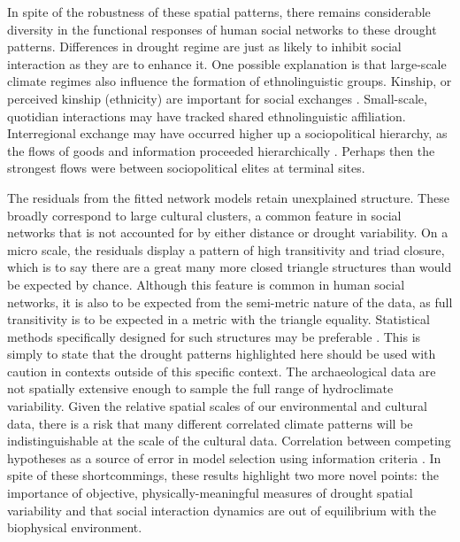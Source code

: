 \documentclass[10pt]{iopart}
\begin{document}

In spite of the robustness of these spatial patterns, there remains considerable diversity in the functional responses of human social networks to these drought patterns. Differences in drought regime are just as likely to inhibit social interaction as they are to enhance it. One possible explanation is that large-scale climate regimes also influence the formation of ethnolinguistic groups. Kinship, or perceived kinship (ethnicity) are important for social exchanges \parencite{Nolin2010}. Small-scale, quotidian interactions may have tracked shared ethnolinguistic affiliation. Interregional exchange may have occurred higher up a sociopolitical hierarchy, as the flows of goods and information proceeded hierarchically \parencite{Crumley1979}. Perhaps then the strongest flows were between sociopolitical elites at terminal sites.
 
The residuals from the fitted network models retain unexplained structure. These broadly correspond to large cultural clusters, a common feature in social networks that is not accounted for by either distance or drought variability. On a micro scale, the residuals display a pattern of high transitivity and triad closure, which is to say there are a great many more closed triangle structures than would be expected by chance. Although this feature is common in human social networks, it is also to be expected from the semi-metric nature of the data, as full transitivity is to be expected in a metric with the triangle equality. Statistical methods specifically designed for such structures may be preferable \parencite{Stillman2017}. This is simply to state that the drought patterns highlighted here should be used with caution in contexts outside of this specific context. The archaeological data are not spatially extensive enough to sample the full range of hydroclimate variability. Given the relative spatial scales of our environmental and cultural data, there is a risk that many different correlated climate patterns will be indistinguishable at the scale of the cultural data. Correlation between competing hypotheses as a source of error in model selection using information criteria \parencite{Shirk2018}. In spite of these shortcommings, these results highlight two more novel points: the importance of objective, physically-meaningful measures of drought spatial variability and that social interaction dynamics are out of equilibrium with the biophysical environment. 
\end{document}
